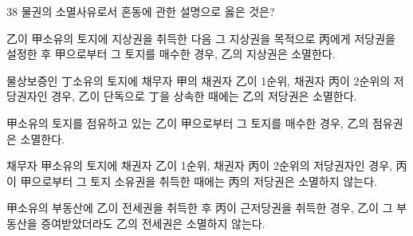 \begin{question}{38}
물권의 소멸사유로서 혼동에 관한 설명으로 옳은 것은?
\begin{choices}
  \item 乙이 甲소유의 토지에 지상권을 취득한 다음 그 지상권을 목적으로 丙에게 저당권을 설정한 후 甲으로부터 그 토지를 매수한 경우, 乙의 지상권은 소멸한다.
  \item 물상보증인 丁소유의 토지에 채무자 甲의 채권자 乙이 1순위, 채권자 丙이 2순위의 저당권자인 경우, 乙이 단독으로 丁을 상속한 때에는 乙의 저당권은 소멸한다.
  \item 甲소유의 토지를 점유하고 있는 乙이 甲으로부터 그 토지를 매수한 경우, 乙의 점유권은 소멸한다.
  \item 채무자 甲소유의 토지에 채권자 乙이 1순위, 채권자 丙이 2순위의 저당권자인 경우, 丙이 甲으로부터 그 토지 소유권을 취득한 때에는 丙의 저당권은 소멸하지 않는다.
  \item 甲소유의 부동산에 乙이 전세권을 취득한 후 丙이 근저당권을 취득한 경우, 乙이 그 부동산을 증여받았더라도 乙의 전세권은 소멸하지 않는다.
\end{choices}
\end{question}
